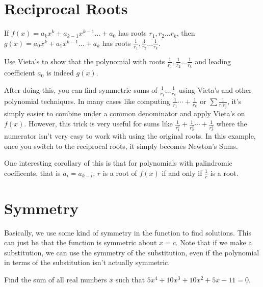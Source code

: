 \documentclass[mast]{lucky}
\begin{document}
\section{Reciprocal Roots}
\begin{theo}
If $f(x)=a_{k}x^{k}+a_{k-1}x^{k-1}\ldots + a_{0}$ has roots $r_{1},r_{2}\ldots r_{k}$, then $g(x)=a_{0}x^{k}+a_{1}x^{k-1}\ldots + a_{k}$ has roots $\frac{1}{r_{1}}, \frac{1}{r_{2}}\ldots \frac{1}{r_{k}}$.
\end{theo}

\begin{pro}
Use Vieta\rq{}s  to show that the polynomial with roots $\frac{1}{r_{1}}, \frac{1}{r_{2}}\ldots \frac{1}{r_{k}}$ and leading coefficient $a_{0}$ is indeed $g(x)$.
\end{pro}

After doing this, you can find symmetric sums of $\frac{1}{r_{1}} \ldots \frac{1}{r_{k}}$ using Vieta\rq{}s and other polynomial techniques. In many cases like computing $\frac{1}{r_{1}}\cdots + \frac{1}{r_{k}}$ or $\sum \frac{1}{r_{i}r_{j}}$, it\rq{}s simply easier to combine under a common denominator and apply Vieta\rq{}s on $f(x)$. However, this trick is very useful for sums like $\frac{1}{r_{1}^2}+\frac{1}{r_{2}^2}\cdots  + \frac{1}{r_{k}^2}$ where the numerator isn\rq{}t very easy to work with using the original roots. In this example, once you switch to the reciprocal roots, it simply becomes Newton\rq{}s Sums.

One interesting corollary of this is that for polynomials with palindromic coefficents, that is $a_{i}=a_{k-i}$, $r$ is a root of $f(x)$ if and only if $\frac{1}{r}$ is a root.


\newpage
\section{Symmetry}
Basically, we use some kind of symmetry in the function to find solutions. This can just be that the function is symmetric about $x=c$. Note that if we make a substitution, we can use the symmetry of the substitution, even if the polynomial in terms of the substitution isn't actually symmetric.
\begin{exam}
Find the sum of all real numbers $x$ such that $5x^4+10x^3 + 10x^2+5x-11 = 0.$
\end{exam}
\end{document}
